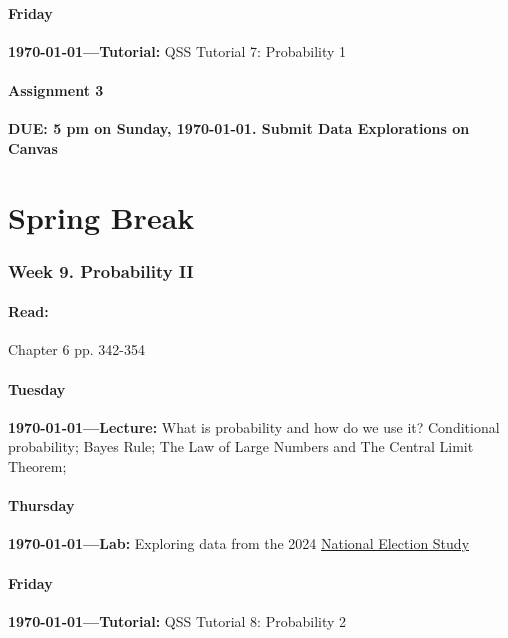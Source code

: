 \AdvanceDate[1]
\subsection{Friday} \textbf{\today---Tutorial:} QSS Tutorial 7: Probability 1
\AdvanceDate[2]


\vspace{2em}
\subsection{Assignment 3} \textbf{DUE: 5 pm on Sunday, \today. Submit Data Explorations on Canvas}

\AdvanceDate[2]
\AdvanceDate[7]


\vspace{2em}

\part*{Spring Break}

\vspace{2em}


\section{Week 9. Probability II}

\subsection{Read:}

\citet{Imai2022-pm} Chapter 6 pp. 342-354


\subsection{Tuesday} \textbf{\today---Lecture:} What is probability and how do we use it? Conditional probability; Bayes Rule; The Law of Large Numbers and The Central Limit Theorem;
\AdvanceDate[2]

\subsection{Thursday} \textbf{\today---Lab:} Exploring data from the 2024 \href{http://electionstudies.org/}{National Election Study}

\AdvanceDate[1]
\subsection{Friday} \textbf{\today---Tutorial:} QSS Tutorial 8: Probability 2
\AdvanceDate[4]

